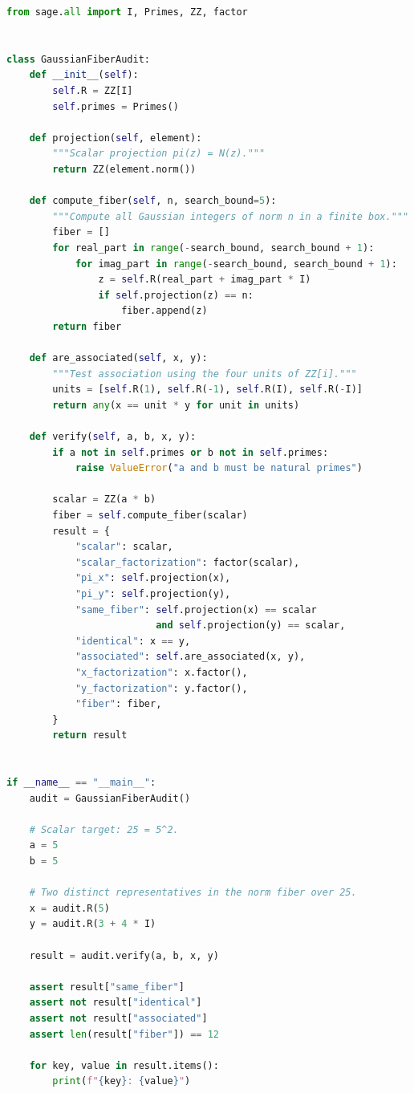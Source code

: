 \documentclass[11pt,a4paper,reqno]{amsart}
\theoremstyle{definition}
\theoremstyle{remark}
\begin{document}
\begin{lstlisting}[language=Python,caption={SageMath-Referenzskript für die Faser über 25}]
from sage.all import I, Primes, ZZ, factor


class GaussianFiberAudit:
    def __init__(self):
        self.R = ZZ[I]
        self.primes = Primes()

    def projection(self, element):
        """Scalar projection pi(z) = N(z)."""
        return ZZ(element.norm())

    def compute_fiber(self, n, search_bound=5):
        """Compute all Gaussian integers of norm n in a finite box."""
        fiber = []
        for real_part in range(-search_bound, search_bound + 1):
            for imag_part in range(-search_bound, search_bound + 1):
                z = self.R(real_part + imag_part * I)
                if self.projection(z) == n:
                    fiber.append(z)
        return fiber

    def are_associated(self, x, y):
        """Test association using the four units of ZZ[i]."""
        units = [self.R(1), self.R(-1), self.R(I), self.R(-I)]
        return any(x == unit * y for unit in units)

    def verify(self, a, b, x, y):
        if a not in self.primes or b not in self.primes:
            raise ValueError("a and b must be natural primes")

        scalar = ZZ(a * b)
        fiber = self.compute_fiber(scalar)
        result = {
            "scalar": scalar,
            "scalar_factorization": factor(scalar),
            "pi_x": self.projection(x),
            "pi_y": self.projection(y),
            "same_fiber": self.projection(x) == scalar
                          and self.projection(y) == scalar,
            "identical": x == y,
            "associated": self.are_associated(x, y),
            "x_factorization": x.factor(),
            "y_factorization": y.factor(),
            "fiber": fiber,
        }
        return result


if __name__ == "__main__":
    audit = GaussianFiberAudit()

    # Scalar target: 25 = 5^2.
    a = 5
    b = 5

    # Two distinct representatives in the norm fiber over 25.
    x = audit.R(5)
    y = audit.R(3 + 4 * I)

    result = audit.verify(a, b, x, y)

    assert result["same_fiber"]
    assert not result["identical"]
    assert not result["associated"]
    assert len(result["fiber"]) == 12

    for key, value in result.items():
        print(f"{key}: {value}")
\end{lstlisting}
\end{document}
